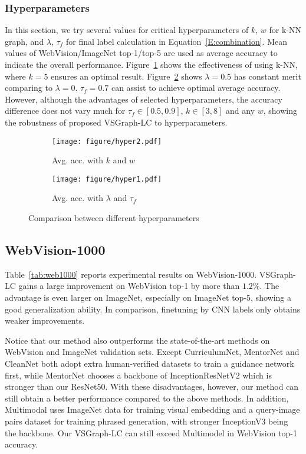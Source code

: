 \documentclass[sigconf]{acmart}
\begin{document}
\subsubsection{Hyperparameters}
\label{S:exp-hyper}
In this section, we try several values for critical hyperparameters of $k$, $w$ for k-NN graph, and $\lambda$, $\tau_f$ for final label calculation in Equation~\ref{E:combination}. 
Mean values of WebVision/ImageNet top-1/top-5 are used as average accuracy to indicate the overall performance. Figure~\ref{fig:hyper1} shows the effectiveness of using k-NN, where $k=5$ ensures an optimal result. Figure~\ref{fig:hyper2} shows $\lambda=0.5$ has constant merit comparing to $\lambda=0$. $\tau_f=0.7$ can assist to achieve optimal average accuracy. 
However, although the advantages of selected hyperparameters, the accuracy difference does not vary much for $\tau_f\in[0.5,0.9]$, $k\in[3,8]$ and any $w$, showing the robustness of proposed VSGraph-LC to hyperparameters.


\begin{figure}[t]
	\centering
	\begin{subfigure}{.23\textwidth}
		\centering
\texttt{[image: figure/hyper2.pdf]}  
		\caption{Avg. acc. with $k$ and $w$}
		\label{fig:hyper1}
	\end{subfigure}
	\begin{subfigure}{.23\textwidth}
		\centering
\texttt{[image: figure/hyper1.pdf]}  
		\caption{Avg. acc. with $\lambda$ and $\tau_f$}
		\label{fig:hyper2}
	\end{subfigure}
\caption{Comparison between different hyperparameters}
	\label{fig:hyper}
\end{figure}

\subsection{WebVision-1000}

Table~\ref{tab:web1000} reports experimental results on WebVision-1000. VSGraph-LC gains a large improvement on WebVision top-1 by more than $1.2\%$. The advantage is even larger on ImageNet, especially on ImageNet top-5, showing a good generalization ability. In comparison, finetuning by CNN labels only obtains weaker improvements.

Notice that our method also outperforms the state-of-the-art methods on WebVision and ImageNet validation sets. Except CurriculumNet, MentorNet and CleanNet both adopt extra human-verified datasets to train a guidance network first, while MentorNet chooses a backbone of InceptionResNetV2 which is stronger than our ResNet50. With these disadvantages, however, our method can still obtain a better performance compared to the above methods. In addition, Multimodal uses ImageNet data for training visual embedding and a query-image pairs dataset for training phrased generation, with stronger InceptionV3 being the backbone. Our VSGraph-LC can still exceed Multimodel in WebVision top-1 accuracy. 
\end{document}
